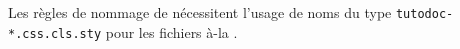 \documentclass[12pt, a4paper, theme = color]{tutodoc}
\begin{document}
\begin{tdoctech}
    \item Les règles de nommage de \ctan nécessitent l'usage de noms du type \verb+tutodoc-*.css.cls.sty+ pour les fichiers à-la .
\end{tdoctech}
\end{document}
